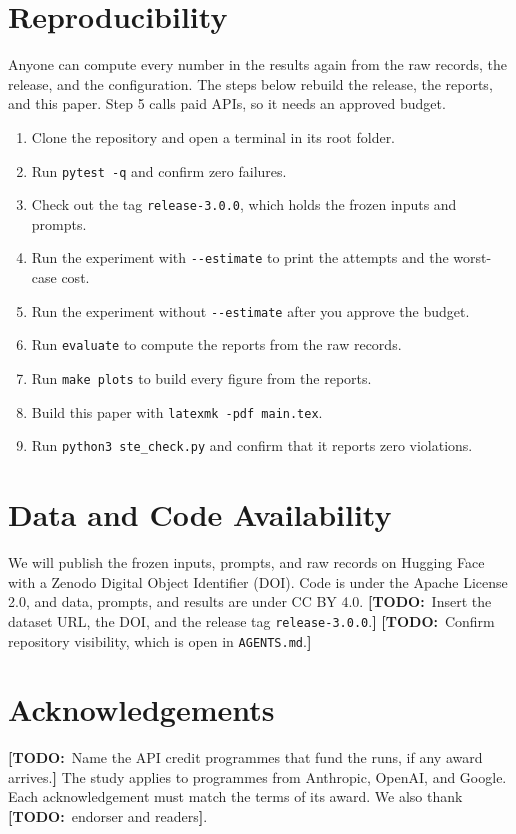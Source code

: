 \documentclass[10pt,twocolumn,letterpaper]{article}
\newcommand{\todo}[1]{{\color{red!70!black}\textbf{[TODO:}~#1\textbf{]}}}
\newcommand{\code}[1]{\texttt{#1}}
\newenvironment{procedure}{\begin{enumerate}[leftmargin=*,itemsep=1pt]}{\end{enumerate}}
\begin{document}
\section{Reproducibility}\label{sec:repro}
Anyone can compute every number in the results again from the raw records, the release, and the configuration. The steps below rebuild the release, the reports, and this paper. Step 5 calls paid APIs, so it needs an approved budget.
\begin{procedure}
  \item Clone the repository and open a terminal in its root folder.
  \item Run \code{pytest -q} and confirm zero failures.
  \item Check out the tag \code{release-3.0.0}, which holds the frozen inputs and prompts.
  \item Run the experiment with \code{-{}-estimate} to print the attempts and the worst-case cost.
  \item Run the experiment without \code{-{}-estimate} after you approve the budget.
  \item Run \code{evaluate} to compute the reports from the raw records.
  \item Run \code{make plots} to build every figure from the reports.
  \item Build this paper with \code{latexmk -pdf main.tex}.
  \item Run \code{python3 ste\_check.py} and confirm that it reports zero violations.
\end{procedure}

\section*{Data and Code Availability}
We will publish the frozen inputs, prompts, and raw records on Hugging Face with a Zenodo Digital Object Identifier (DOI). Code is under the Apache License 2.0, and data, prompts, and results are under CC BY 4.0. \todo{Insert the dataset URL, the DOI, and the release tag \code{release-3.0.0}.} \todo{Confirm repository visibility, which is open in \code{AGENTS.md}.}

\section*{Acknowledgements}
\todo{Name the API credit programmes that fund the runs, if any award arrives.} The study applies to programmes from Anthropic, OpenAI, and Google. Each acknowledgement must match the terms of its award. We also thank \todo{endorser and readers}.
\end{document}
